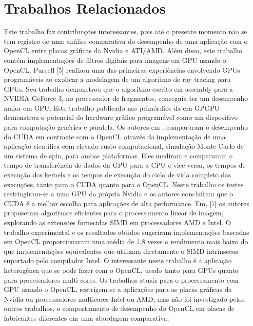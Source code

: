 \section{Trabalhos Relacionados}

Este trabalho faz contribuições interessantes, pois até o presente momento não se tem registro de uma análise comparativa do desempenho de uma aplicação com o OpenCL entre placas gráficas da Nvidia e ATI/AMD. Além disso, este trabalho contém implementações de filtros digitais para imagens em GPU usando o OpenCL.
Purcell [5] realizou uma das primeiras experiências envolvendo GPUs programáveis ao explicar a modelagem de um algoritmo de  ray tracing  para GPUs. Seu trabalho demonstrou que o algoritmo escrito em  assembly  para a  NVIDIA GeForce 3,  no processador de fragmentos, conseguia ter um desempenho maior em GPU. Este trabalho publicado nos primórdios da era GPGPU demonstrou o  potencial do hardware gráfico programável como um dispositivo para computação genérica e paralela.
Os autores em \cite{DBLP:journals/corr/abs-1005-2581}, compararam o desempenho do CUDA em contraste com o OpenCL através da implementação de uma aplicação científica com elevado custo computacional, simulação Monte Carlo de um sistema de spin, para ambas plataformas. Eles mediram e compararam o tempo de transferência de dados da GPU para a CPU e vice-versa, os tempos de execução dos kernels e os tempos de execução do ciclo de vida completo das execuções, tanto para o CUDA quanto para o OpenCL. Neste trabalho os testes restringiram-se a uma GPU da própria Nvidia e os autores concluíram que o CUDA é a melhor escolha para aplicações de alta performance.
Em, [7] os autores propuseram algoritmos eficientes para o processamento linear de imagem, explorando as extensões fornecidas SIMD em processadores AMD e Intel. O trabalho experimental e os resultados obtidos sugeriram implementações baseadas em OpenCL proporcionaram uma média de 1,8 vezes o rendimento mais baixo do que implementações equivalentes que utilizam diretamente o SIMD intrínsecos suportado pelo compilador Intel. O interessante neste trabalho é a aplicação heterogênea que se pode fazer com o OpenCL, usado tanto para GPUs quanto para processadores multi-cores.
Os trabalhos atuais para o processamento com GPU usando o OpenCL, restrigem-se a aplicações para as placas gráficas da Nvidia ou processadores multicores Intel ou AMD, mas não foi investigado pelos outros trabalhos, o comportamento de desempenho do OpenCL em placas de fabricantes diferentes em uma abordagem comparativa.


